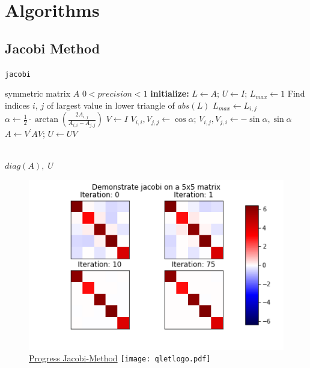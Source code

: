 \documentclass[12pt]{article}
\begin{document}
\section{Algorithms}
\subsection{Jacobi Method}


\begin{algorithm}
\caption{\texttt{jacobi}}
\label{j-algo}
\begin{algorithmic}[1]
  \Require symmetric matrix $A$
  \Ensure $0 < precision < 1$
  \Statex \textbf{initialize: } $L \gets A$; $U \gets I$; $L_{max} \gets 1$
    \State Find indices $i$, $j$ of largest value in lower triangle of $abs(L)$
        \State $L_{max} \gets L_{i,j}$
            \State $\alpha \gets \frac{1}{2}\cdot \arctan(\frac{2A_{i, j}}{A_{i, i}-A_{j, j}})$
    \State $V \gets I$
    \State $V_{i, i}, V_{j, j} \gets \cos \alpha$; $V_{i, j}, V_{j, i} \gets -\sin \alpha, \sin \alpha$
    \State $A \gets V^{\prime} A V$; $U \gets UV$

  \EndWhile\\
  \Return $diag(A),\; U$
\end{algorithmic}
\end{algorithm}


\begin{figure}
\begin{center}
\caption{\href {https://github.com/thsis/NIS18/tree/master/media/plots}{Progress Jacobi-Method}  \protect\texttt{[image: qletlogo.pdf]}}
  \includegraphics[scale=0.6]{../media/plots/jacobi.png}
\end{center}
\end{figure}
\end{document}
